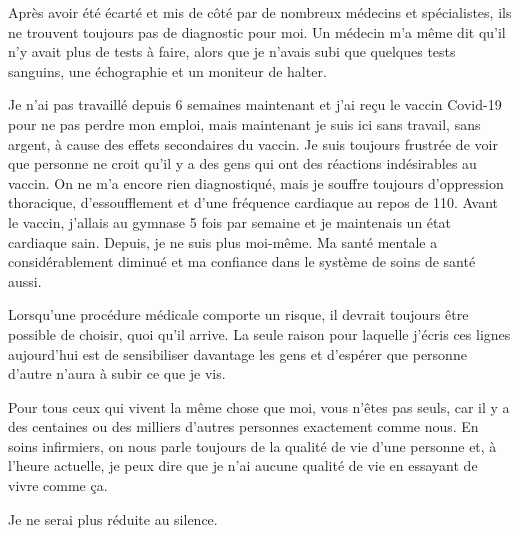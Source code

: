 Après avoir été écarté et mis de côté par de nombreux médecins et spécialistes,
ils ne trouvent toujours pas de diagnostic pour moi. Un médecin m'a même dit
qu'il n'y avait plus de tests à faire, alors que je n'avais subi que quelques
tests sanguins, une échographie et un moniteur de halter.

Je n'ai pas travaillé depuis 6 semaines maintenant et j'ai reçu le vaccin
Covid-19 pour ne pas perdre mon emploi, mais maintenant je suis ici sans
travail, sans argent, à cause des effets secondaires du vaccin. Je suis toujours
frustrée de voir que personne ne croit qu'il y a des gens qui ont des réactions
indésirables au vaccin. On ne m'a encore rien diagnostiqué, mais je souffre
toujours d'oppression thoracique, d'essoufflement et d'une fréquence cardiaque
au repos de 110. Avant le vaccin, j'allais au gymnase 5 fois par semaine et je
maintenais un état cardiaque sain. Depuis, je ne suis plus moi-même. Ma santé
mentale a considérablement diminué et ma confiance dans le système de soins de
santé aussi.

Lorsqu'une procédure médicale comporte un risque, il devrait toujours être
possible de choisir, quoi qu'il arrive. La seule raison pour laquelle j'écris
ces lignes aujourd'hui est de sensibiliser davantage les gens et d'espérer que
personne d'autre n'aura à subir ce que je vis.

Pour tous ceux qui vivent la même chose que moi, vous n'êtes pas seuls, car il y
a des centaines ou des milliers d'autres personnes exactement comme nous. En
soins infirmiers, on nous parle toujours de la qualité de vie d'une personne et,
à l'heure actuelle, je peux dire que je n'ai aucune qualité de vie en essayant
de vivre comme ça.

Je ne serai plus réduite au silence.

